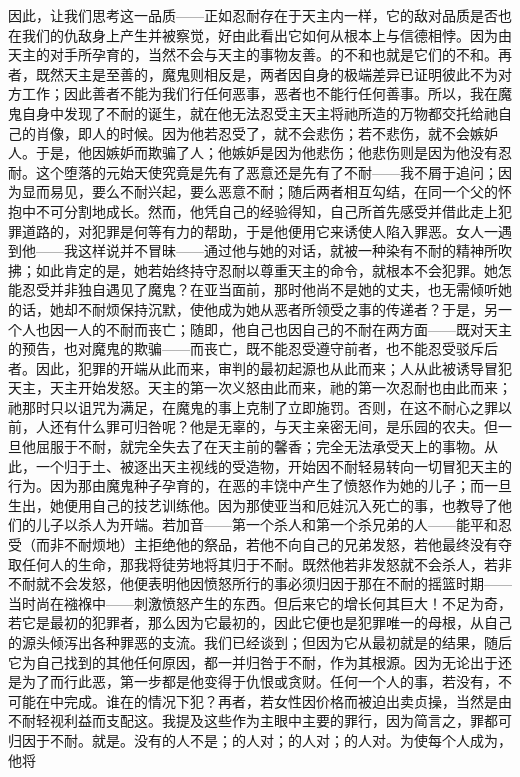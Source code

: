 因此，让我们思考这一品质——正如忍耐存在于天主内一样，它的敌对品质是否也在我们的仇敌身上产生并被察觉，好由此看出它如何从根本上与信德相悖。因为由天主的对手所孕育的，当然不会与天主的事物友善。的不和也就是它们的不和。再者，既然天主是至善的，魔鬼则相反是，两者因自身的极端差异已证明彼此不为对方工作；因此善者不能为我们行任何恶事，恶者也不能行任何善事。所以，我在魔鬼自身中发现了不耐的诞生，就在他无法忍受主天主将祂所造的万物都交托给祂自己的肖像，即人的时候。因为他若忍受了，就不会悲伤；若不悲伤，就不会嫉妒人。于是，他因嫉妒而欺骗了人；他嫉妒是因为他悲伤；他悲伤则是因为他没有忍耐。这个堕落的元始天使究竟是先有了恶意还是先有了不耐——我不屑于追问；因为显而易见，要么不耐兴起，要么恶意不耐；随后两者相互勾结，在同一个父的怀抱中不可分割地成长。然而，他凭自己的经验得知，自己所首先感受并借此走上犯罪道路的，对犯罪是何等有力的帮助，于是他便用它来诱使人陷入罪恶。女人一遇到他——我这样说并不冒昧——通过他与她的对话，就被一种染有不耐的精神所吹拂；如此肯定的是，她若始终持守忍耐以尊重天主的命令，就根本不会犯罪。她怎能忍受并非独自遇见了魔鬼？在亚当面前，那时他尚不是她的丈夫，也无需倾听她的话，她却不耐烦保持沉默，使他成为她从恶者所领受之事的传递者？于是，另一个人也因一人的不耐而丧亡；随即，他自己也因自己的不耐在两方面——既对天主的预告，也对魔鬼的欺骗——而丧亡，既不能忍受遵守前者，也不能忍受驳斥后者。因此，犯罪的开端从此而来，审判的最初起源也从此而来；人从此被诱导冒犯天主，天主开始发怒。天主的第一次义怒由此而来，祂的第一次忍耐也由此而来；祂那时只以诅咒为满足，在魔鬼的事上克制了立即施罚。否则，在这不耐心之罪以前，人还有什么罪可归咎呢？他是无辜的，与天主亲密无间，是乐园的农夫。但一旦他屈服于不耐，就完全失去了在天主前的馨香；完全无法承受天上的事物。从此，一个归于土、被逐出天主视线的受造物，开始因不耐轻易转向一切冒犯天主的行为。因为那由魔鬼种子孕育的，在恶的丰饶中产生了愤怒作为她的儿子；而一旦生出，她便用自己的技艺训练他。因为那使亚当和厄娃沉入死亡的事，也教导了他们的儿子以杀人为开端。若加音——第一个杀人和第一个杀兄弟的人——能平和忍受（而非不耐烦地）主拒绝他的祭品，若他不向自己的兄弟发怒，若他最终没有夺取任何人的生命，那我将徒劳地将其归于不耐。既然他若非发怒就不会杀人，若非不耐就不会发怒，他便表明他因愤怒所行的事必须归因于那在不耐的摇篮时期——当时尚在襁褓中——刺激愤怒产生的东西。但后来它的增长何其巨大！不足为奇，若它是最初的犯罪者，那么因为它最初的，因此它便也是犯罪唯一的母根，从自己的源头倾泻出各种罪恶的支流。我们已经谈到；但因为它从最初就是的结果，随后它为自己找到的其他任何原因，都一并归咎于不耐，作为其根源。因为无论出于还是为了而行此恶，第一步都是他变得于仇恨或贪财。任何一个人的事，若没有，不可能在中完成。谁在的情况下犯？再者，若女性因价格而被迫出卖贞操，当然是由不耐轻视利益而支配这。我提及这些作为主眼中主要的罪行，因为简言之，罪都可归因于不耐。就是。没有的人不是；的人对；的人对；的人对。为使每个人成为，他将